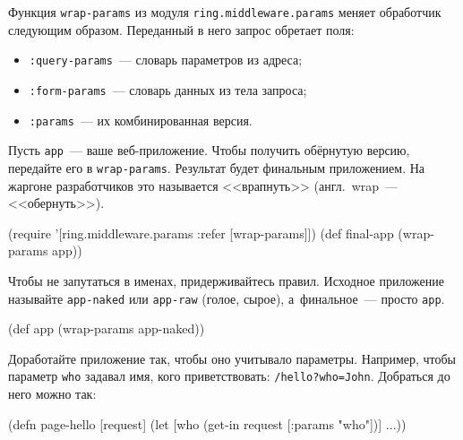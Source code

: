 
Функция \verb|wrap-params| из модуля \verb|ring.middleware.params| меняет
обработчик следующим образом. Переданный в него запрос обретает поля:

\begin{itemize}

\item
  \verb|:query-params|~--- словарь параметров из адреса;

\item
  \verb|:form-params|~--- словарь данных из тела запроса;

\item
  \verb|:params|~--- их комбинированная версия.

\end{itemize}

Пусть \verb|app|~--- ваше веб-приложение. Чтобы получить обёрнутую версию,
передайте его в \verb|wrap-params|. Результат будет финальным приложением. На
жаргоне разработчиков это называется <<врапнуть>> (англ.~wrap~--- <<обернуть>>).


\begin{english}
  \begin{clojure}
(require '[ring.middleware.params :refer [wrap-params]])
(def final-app (wrap-params app))
  \end{clojure}
\end{english}

Чтобы не запутаться в именах, придерживайтесь правил. Исходное приложение
называйте \verb|app-naked| или \verb|app-raw| (голое, сырое), а~финальное~---
просто \verb|app|.

\begin{english}
  \begin{clojure}
(def app (wrap-params app-naked))
  \end{clojure}
\end{english}

Доработайте приложение так, чтобы оно учитывало параметры. Например, чтобы
параметр \verb|who| задавал имя, кого приветствовать:
\verb|/hello?who=John|. Добраться до него можно так:

\begin{english}
  \begin{clojure}
(defn page-hello [request]
  (let [who (get-in request [:params "who"])]
    ...))
  \end{clojure}
\end{english}

